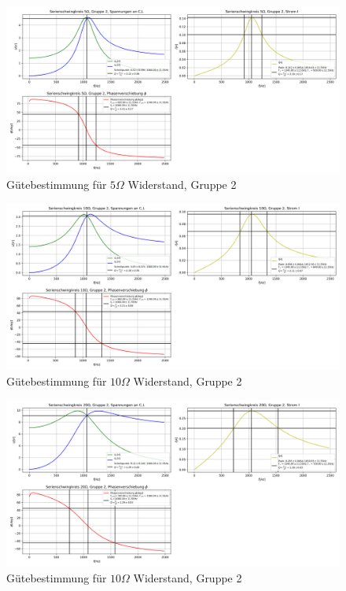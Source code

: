 \documentclass[a4paper, 11pt]{article}
\begin{document}
\begin{figure}[H]
	\hskip-2cm
	\includegraphics[trim = 0mm 0mm 0mm 0mm,clip, width=20cm]{Bilder/R5.png}%
	\caption[Gütebestimmung für $5 \Omega$ Widerstand, Gruppe 2]{Gütebestimmung für $5 \Omega$ Widerstand, Gruppe 2}%
	\label{pic:Abbildung 3}%
\end{figure}
\begin{figure}[H]
	\hskip-2cm
	\includegraphics[trim = 0mm 0mm 0mm 0mm,clip, width=20cm]{Bilder/R10.png}%
	\caption[Gütebestimmung für $10\Omega$ Widerstand, Gruppe 2]{Gütebestimmung für $10 \Omega$ Widerstand, Gruppe 2}%
	\label{pic:Abbildung 3}%
\end{figure}
\begin{figure}[H]
	\hskip-2cm
	\includegraphics[trim = 0mm 0mm 0mm 0mm,clip, width=20cm]{Bilder/R20.png}%
	\caption[Gütebestimmung für $20 \Omega$ Widerstand, Gruppe 2]{Gütebestimmung für $10 \Omega$ Widerstand, Gruppe 2}%
	\label{pic:Abbildung 3}%
\end{figure}
\end{document}
